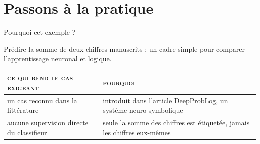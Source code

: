 \documentclass[aspectratio=169,10pt]{beamer}
\begin{document}
\section{Passons à la pratique}

\begin{frame}{Pourquoi cet exemple ?}
  \begin{center}
    \small Prédire la somme de deux chiffres manuscrits : un cadre
    simple pour comparer l'apprentissage neuronal et logique.
  \end{center}

  \vspace{0.6em}
  \begin{center}
  \footnotesize
  \renewcommand{\arraystretch}{1.8}
  \begin{tabular}{@{} l >{\raggedright\arraybackslash}m{5.6cm} @{}}
    \toprule
    {\color{ash}\scshape\footnotesize ce qui rend le cas exigeant} &
    {\color{ash}\scshape\footnotesize pourquoi} \\
    \midrule
    un cas reconnu dans la littérature & introduit dans l'article
      DeepProbLog, un système neuro-symbolique \\
    aucune supervision directe du classifieur & seule la somme des
      chiffres est étiquetée, jamais les chiffres eux-mêmes \\
    \bottomrule
  \end{tabular}
  \end{center}
\end{frame}
\end{document}
